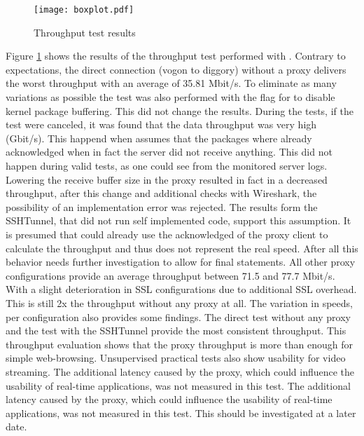 \documentclass[12pt, a4paper]{scrartcl}
\begin{document}
\begin{figure}
    \centering
    \texttt{[image: boxplot.pdf]}
    \caption{Throughput test results}\label{fig::boxres}
\end{figure}
\noindent Figure \@\ref{fig::boxres} shows the results of the throughput test performed with . Contrary to expectations, the direct connection (vogon to diggory) without a proxy delivers the worst throughput with an average of 35.81 Mbit/s. To eliminate as many variations as possible the test was also performed with the  flag for  to disable kernel package buffering. This did not change the results.\newline
During the tests, if the test were canceled, it was found that the data throughput was very high (Gbit/s). This happend when  assumes that the packages where already acknowledged when in fact the server did not receive anything. This did not happen during valid tests, as one could see from the monitored server logs. Lowering the receive buffer size in the proxy resulted in fact in a decreased throughput, after this change and additional checks with Wireshark, the possibility of an implementation error was rejected. The results form the SSHTunnel, that did not run self implemented code, support this assumption. It is presumed that  could already use the acknowledged of the proxy client to calculate the throughput and thus does not represent the real speed. After all this behavior needs further investigation to allow for final statements.\newline
All other proxy configurations provide an average throughput between 71.5 and 77.7 Mbit/s. With a slight deterioration in \ac{SSL} configurations due to additional \ac{SSL} overhead. This is still 2x the throughput without any proxy at all. The variation in speeds, per configuration also provides some findings. The direct test without any proxy and the test with the SSHTunnel provide the most consistent throughput.\newline
This throughput evaluation shows that the proxy throughput is more than enough for simple web-browsing. Unsupervised practical tests also show usability for video streaming. The additional latency caused by the proxy, which could influence the usability of real-time applications, was not measured in this test. The additional latency caused by the proxy, which could influence the usability of real-time applications, was not measured in this test. This should be investigated at a later date.
\end{document}
